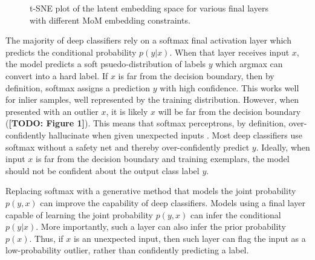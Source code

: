 \documentclass[10pt,twocolumn,letterpaper]{article}
\newcommand{\TODO}[1]{\textbf{\color{red}[TODO: #1]}}
\begin{document}
\begin{figure}[ht]
\begin{subfigure}[t]{.24\textwidth}
		\subcaption{}
	\end{subfigure}
	\caption{t-SNE\cite{tsne} plot of the latent embedding space for various final layers with different MoM embedding constraints.} 
	\label{fig:cifar10tsne}
\end{figure}

The majority of deep classifiers rely on a softmax final activation layer which predicts the conditional probability $p(y|x)$.
When that layer receives input $x$, the model predicts a soft psuedo-distribution of labels $y$ which argmax can convert into a hard label.
If $x$ is far from the decision boundary, then by definition, softmax assigns a prediction $y$ with high confidence.
This works well for inlier samples, well represented by the training distribution.
However, when presented with an outlier $x$, it is likely $x$ will be far from the decision boundary (\TODO{Figure 1}).
This means that softmax perceptrons, by definition, over-confidently hallucinate when given unexpected inputs \cite{wei2022mitigating}. 
Most deep classifiers use softmax without a safety net and thereby over-confidently predict $y$.
Ideally, when input $x$ is far from the decision boundary and training exemplars, the model should not be confident about the output class label $y$.

Replacing softmax with a generative method that models the joint probability $p(y,x)$ can improve the capability of deep classifiers. 
Models using a final layer capable of learning the joint probability $p(y,x)$ can infer the conditional $p(y|x)$.
More importantly, such a layer can also infer the prior probability $p(x)$.
Thus, if $x$ is an unexpected input, then such layer can flag the input as a low-probability outlier, rather than confidently predicting a label.
\end{document}
